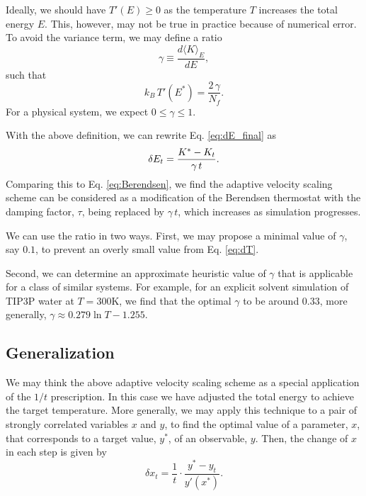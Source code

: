 \documentclass[reprint]{revtex4-1}
\begin{document}
Ideally, we should have $T'(E) \ge 0$
as the temperature $T$ increases the total energy $E$.
%
This, however, may not be true in practice
because of numerical error.
%
%
To avoid the variance term,
we may define a ratio
%
\begin{equation}
  \gamma
  \equiv
  \frac
  {
    d \langle K \rangle_E
  }
  {
    dE
  }
  ,
  \label{eq:gamma_def}
\end{equation}
%
such that
%
\begin{equation}
  k_B \, T'(E^*)
  =
  \frac{ 2 \, \gamma } { N_f }
  .
  \label{eq:dT_approx}
\end{equation}
%
For a physical system, we expect $0 \le \gamma \le 1$.
%

With the above definition, we can rewrite Eq. \eqref{eq:dE_final} as
%
\begin{equation}
  \delta E_t
  =
  \frac{ K^* - K_t } { \gamma \, t }
  .
  \notag
\end{equation}
%
Comparing this to Eq. \eqref{eq:Berendsen},
we find the adaptive velocity scaling scheme
can be considered as a modification of the Berendsen thermostat
with the damping factor, $\tau$, being replaced by $\gamma \, t$,
which increases as simulation progresses.


We can use the ratio in two ways.
%
First, we may propose a minimal value of $\gamma$, say $0.1$,
to prevent an overly small value from Eq. \eqref{eq:dT}.

Second,
we can determine an approximate heuristic value of $\gamma$
that is applicable for a class of similar systems.
%
For example,
for an explicit solvent simulation of TIP3P water\cite{jorgensen1983}
at $T = 300\mathrm K$, we find that the optimal $\gamma$
to be around $0.33$,
more generally, $\gamma \approx 0.279\ln T - 1.255$.


\subsection{Generalization}


We may think the above adaptive velocity scaling scheme
as a special application of the $1/t$ prescription.
%
In this case we have adjusted the total energy
to achieve the target temperature.
%
More generally, we may apply this technique
to a pair of strongly correlated variables $x$ and $y$,
to find the optimal value of a parameter, $x$,
that corresponds to a target value, $y^*$, of an observable, $y$.
%
Then, the change of $x$ in each step is given by
%
\begin{equation}
  \delta x_t = \frac 1 t
  \cdot
  \frac{ y^* - y_t }
       { y'(x^*) }
  .
  \label{eq:adjustxy}
\end{equation}
%
\end{document}
